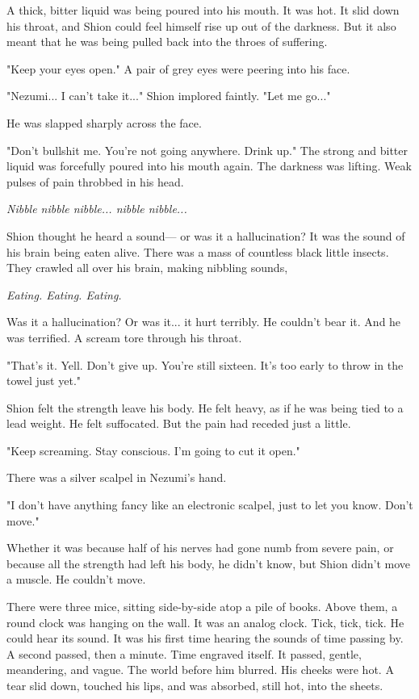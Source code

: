 A thick, bitter liquid was being poured into his mouth. It was hot. It
slid down his throat, and Shion could feel himself rise up out of the
darkness. But it also meant that he was being pulled back into the
throes of suffering.

"Keep your eyes open." A pair of grey eyes were peering into his face.

"Nezumi... I can't take it..." Shion implored faintly. "Let me go..."

He was slapped sharply across the face.

"Don't bullshit me. You're not going anywhere. Drink up." The strong and
bitter liquid was forcefully poured into his mouth again. The darkness
was lifting. Weak pulses of pain throbbed in his head.

\emph{Nibble nibble nibble... nibble nibble...}

Shion thought he heard a sound--- or was it a hallucination? It was the
sound of his brain being eaten alive. There was a mass of countless
black little insects. They crawled all over his brain, making nibbling
sounds,

\emph{Eating. Eating. Eating.}

Was it a hallucination? Or was it... it hurt terribly. He couldn't bear
it. And he was terrified. A scream tore through his throat.

"That's it. Yell. Don't give up. You're still sixteen. It's too early to
throw in the towel just yet."

Shion felt the strength leave his body. He felt heavy, as if he was
being tied to a lead weight. He felt suffocated. But the pain had
receded just a little.

"Keep screaming. Stay conscious. I'm going to cut it open."

There was a silver scalpel in Nezumi's hand.

"I don't have anything fancy like an electronic scalpel, just to let you
know. Don't move."

Whether it was because half of his nerves had gone numb from severe
pain, or because all the strength had left his body, he didn't know, but
Shion didn't move a muscle. He couldn't move.

There were three mice, sitting side-by-side atop a pile of books. Above
them, a round clock was hanging on the wall. It was an analog clock.
Tick, tick, tick. He could hear its sound. It was his first time hearing
the sounds of time passing by. A second passed, then a minute. Time
engraved itself. It passed, gentle, meandering, and vague. The world
before him blurred. His cheeks were hot. A tear slid down, touched his
lips, and was absorbed, still hot, into the sheets.


